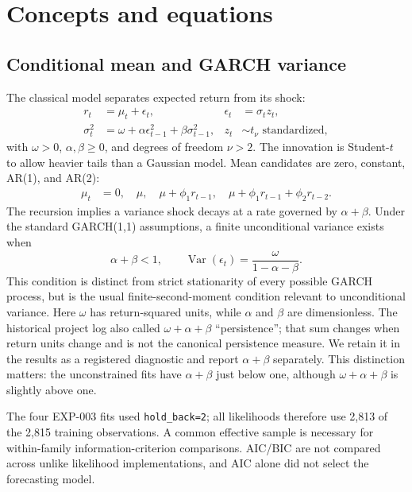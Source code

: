 \documentclass[11pt,a4paper]{article}
\begin{document}
\section{Concepts and equations}
\subsection{Conditional mean and GARCH variance}
The classical model separates expected return from its shock:
\begin{align}
 r_t &= \mu_t+\epsilon_t, & \epsilon_t&=\sigma_t z_t,\\
 \sigma_t^2&=\omega+\alpha\epsilon_{t-1}^2+\beta\sigma_{t-1}^2,
 & z_t&\sim t_\nu\text{ standardized},
\end{align}
with $\omega>0$, $\alpha,\beta\geq0$, and degrees of freedom $\nu>2$. The innovation is
Student-$t$ to allow heavier tails than a Gaussian model. Mean candidates are zero, constant,
AR(1), and AR(2):
\begin{align}
\mu_t&=0,\quad \mu,\quad \mu+\phi_1r_{t-1},\quad
\mu+\phi_1r_{t-1}+\phi_2r_{t-2}.
\end{align}
The recursion implies a variance shock decays at a rate governed by $\alpha+\beta$. Under the
standard GARCH(1,1) assumptions, a finite unconditional variance exists when
\begin{equation}
 \alpha+\beta<1,\qquad \operatorname{Var}(\epsilon_t)=\frac{\omega}{1-\alpha-\beta}.
\end{equation}
This condition is distinct from strict stationarity of every possible GARCH process, but is the
usual finite-second-moment condition relevant to unconditional variance. Here $\omega$ has
return-squared units, while $\alpha$ and $\beta$ are dimensionless. The historical project log
also called $\omega+\alpha+\beta$ ``persistence''; that sum changes when return units change and
is not the canonical persistence measure. We retain it in the results as a registered diagnostic
and report $\alpha+\beta$ separately. This distinction matters: the unconstrained fits have
$\alpha+\beta$ just below one, although $\omega+\alpha+\beta$ is slightly above one.

The four EXP-003 fits used \texttt{hold\_back=2}; all likelihoods therefore use 2,813 of the
2,815 training observations. A common effective sample is necessary for within-family
information-criterion comparisons. AIC/BIC are not compared across unlike likelihood
implementations, and AIC alone did not select the forecasting model.
\end{document}
